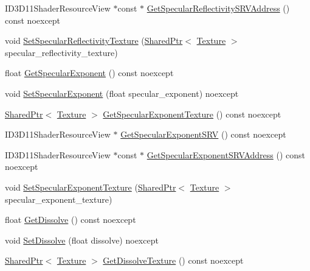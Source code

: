 \begin{DoxyCompactItemize}
\item 
I\+D3\+D11\+Shader\+Resource\+View $\ast$const  $\ast$ \hyperlink{structmage_1_1_shaded_material_a49e9f7f63c8bdbf471811e0a1d161340}{Get\+Specular\+Reflectivity\+S\+R\+V\+Address} () const noexcept
\item 
void \hyperlink{structmage_1_1_shaded_material_a8bd9bf0a0b1f636a74d3452c58b5b98d}{Set\+Specular\+Reflectivity\+Texture} (\hyperlink{namespacemage_a1e01ae66713838a7a67d30e44c67703e}{Shared\+Ptr}$<$ \hyperlink{classmage_1_1_texture}{Texture} $>$ specular\+\_\+reflectivity\+\_\+texture)
\item 
float \hyperlink{structmage_1_1_shaded_material_adb859615bf3461e9554e91550860d588}{Get\+Specular\+Exponent} () const noexcept
\item 
void \hyperlink{structmage_1_1_shaded_material_ae9c4286f2802a30698863c9abe95e60d}{Set\+Specular\+Exponent} (float specular\+\_\+exponent) noexcept
\item 
\hyperlink{namespacemage_a1e01ae66713838a7a67d30e44c67703e}{Shared\+Ptr}$<$ \hyperlink{classmage_1_1_texture}{Texture} $>$ \hyperlink{structmage_1_1_shaded_material_a0d1d76e70949caf33e30aa474882b364}{Get\+Specular\+Exponent\+Texture} () const noexcept
\item 
I\+D3\+D11\+Shader\+Resource\+View $\ast$ \hyperlink{structmage_1_1_shaded_material_abae39d873aab545a59d1b611cf9b2025}{Get\+Specular\+Exponent\+S\+RV} () const noexcept
\item 
I\+D3\+D11\+Shader\+Resource\+View $\ast$const  $\ast$ \hyperlink{structmage_1_1_shaded_material_a25cfefef7f34cf03568c41b690264569}{Get\+Specular\+Exponent\+S\+R\+V\+Address} () const noexcept
\item 
void \hyperlink{structmage_1_1_shaded_material_a5ef7c32a67a49814a448667779cfcb4b}{Set\+Specular\+Exponent\+Texture} (\hyperlink{namespacemage_a1e01ae66713838a7a67d30e44c67703e}{Shared\+Ptr}$<$ \hyperlink{classmage_1_1_texture}{Texture} $>$ specular\+\_\+exponent\+\_\+texture)
\item 
float \hyperlink{structmage_1_1_shaded_material_adff98fa9d3ace697033106e04d09ac98}{Get\+Dissolve} () const noexcept
\item 
void \hyperlink{structmage_1_1_shaded_material_a403f3e4e673d31fffdb387f518393453}{Set\+Dissolve} (float dissolve) noexcept
\item 
\hyperlink{namespacemage_a1e01ae66713838a7a67d30e44c67703e}{Shared\+Ptr}$<$ \hyperlink{classmage_1_1_texture}{Texture} $>$ \hyperlink{structmage_1_1_shaded_material_a442e7331e699f4b21f59e289272a361a}{Get\+Dissolve\+Texture} () const noexcept

\end{DoxyCompactItemize}
